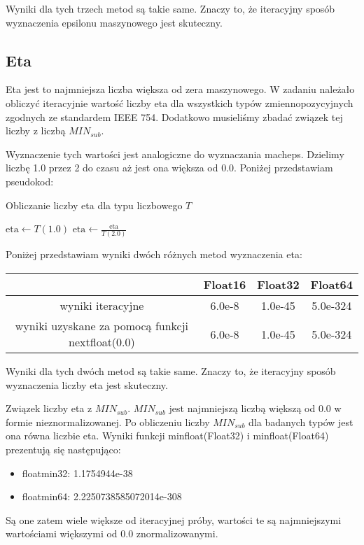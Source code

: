 \documentclass{article}
\begin{document}
Wyniki dla tych trzech metod są takie same. Znaczy to, że iteracyjny sposób wyznaczenia epsilonu maszynowego jest skuteczny.
\subsection*{Eta}
Eta jest to najmniejsza liczba większa od zera maszynowego. W zadaniu należało obliczyć iteracyjnie wartość liczby eta dla wszystkich typów zmiennopozycyjnych zgodnych ze standardem IEEE 754. Dodatkowo musieliśmy zbadać związek tej liczby z liczbą $MIN_{sub}$.

Wyznaczenie tych wartości jest analogiczne do wyznaczania macheps. Dzielimy liczbę 1.0 przez 2 do czasu aż jest ona większa od 0.0. Poniżej przedstawiam pseudokod:


\begin{algorithm}
\caption{Obliczanie liczby eta dla typu liczbowego \( T \)}
\begin{algorithmic}[1]
    \State \( \text{eta} \gets T(1.0) \) 
        \State \( \text{eta} \gets \frac{\text{eta}}{T(2.0)} \) 
    \EndWhile
    \State \Return {} 
\EndFunction
\end{algorithmic}
\end{algorithm}
    Poniżej przedstawiam wyniki dwóch różnych metod wyznaczenia eta:
\begin{center}
  \begin{tabular}{|c|c|c|c|}
    \hline
       & Float16 & Float32 & Float64  \\ [0.5ex]
    \hline
    wyniki iteracyjne & 6.0e-8  & 1.0e-45 & 5.0e-324 \\
    \hline
    wyniki uzyskane za pomocą funkcji nextfloat(0.0) & 6.0e-8  & 1.0e-45 & 5.0e-324 \\
    \hline
  \end{tabular}
\end{center}

Wyniki dla tych dwóch metod są takie same. Znaczy to, że iteracyjny sposób wyznaczenia liczby eta jest skuteczny.

Związek liczby eta z $MIN_{sub}$. $MIN_{sub}$ jest najmniejszą liczbą większą od 0.0 w formie nieznormalizowanej. Po obliczeniu liczby $MIN_{sub}$ dla badanych typów jest ona równa liczbie eta. Wyniki funkcji minfloat(Float32) i minfloat(Float64) prezentują się następująco:
\begin{itemize}
\item floatmin32: 1.1754944e-38
\item floatmin64: 2.2250738585072014e-308
\end{itemize}
Są one zatem wiele większe od iteracyjnej próby, wartości te są najmniejszymi wartościami większymi od 0.0 znormalizowanymi.
\end{document}
